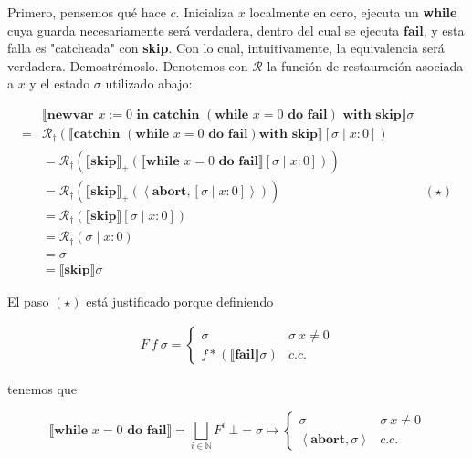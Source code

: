 \documentclass[a4paper, 12pt]{article}
\begin{document}
Primero, pensemos qué hace $c$. Inicializa $x$ localmente en cero, ejecuta un
\textbf{while} cuya guarda necesariamente será verdadera, dentro del cual se
ejecuta $\textbf{fail}$, y esta falla es "catcheada" con \textbf{skip}. Con lo
cual, intuitivamente, la equivalencia será verdadera. Demostrémoslo. Denotemos
con $\mathcal{R}$ la función de restauración asociada a $x$ y el estado $\sigma$
utilizado abajo:

\begin{align*}
  &\llbracket \textbf{newvar } x:= 0 \textbf{ in catchin } (\textbf{while } x = 0
  \textbf{ do } \textbf{fail}) \textbf{ with skip}\rrbracket \sigma \\ 
  =&\mathcal{R}_{\dagger}\left( \llbracket \textbf{catchin } (\textbf{while } x
  = 0\textbf{ do fail} ) \textbf{with skip} \rrbracket[\sigma \mid x : 0]
\right)  \\ 
   &= \mathcal{R}_\dagger \left( \llbracket \textbf{skip} \rrbracket_{+} \left(
   \llbracket \textbf{while } x = 0 \textbf{ do fail}  \rrbracket [\sigma \mid x
: 0]\right)  \right)  \\ 
   &= \mathcal{R}_\dagger\left( \llbracket \textbf{skip} \rrbracket_+\left(
\left<\textbf{abort}, [\sigma \mid x : 0] \right> \right)  \right) &(\star) \\ 
&=\mathcal{R}_\dagger \left( \llbracket \textbf{skip} \rrbracket
[\sigma \mid x : 0 ]\right)  \\ 
&=\mathcal{R}_\dagger\left( \sigma \mid x : 0 \right)  \\ 
&= \sigma \\ 
&= \llbracket \textbf{skip} \rrbracket\sigma
\end{align*}

El paso $(\star)$ está justificado porque definiendo

\begin{align*}
 F ~ f ~ \sigma 
  = \begin{cases}
    \sigma & \sigma ~ x \neq 0 \\ 
    f*(\llbracket \textbf{fail} \rrbracket \sigma) & c.c.
  \end{cases}
\end{align*}

tenemos que 

\begin{equation*}
  \llbracket \textbf{while } x = 0\textbf{ do } \textbf{fail} \rrbracket =
  \bigsqcup_{i \in \mathbb{N}} F^i ~ \bot  = \sigma \mapsto \begin{cases}
    \sigma & \sigma ~ x \neq 0 \\ 
    \left<\textbf{abort}, \sigma \right> & c.c.
  \end{cases}
\end{equation*}
\end{document}
